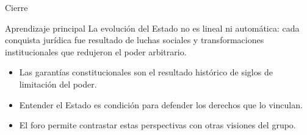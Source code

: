 \documentclass[
  spanish,
  aspectratio=169,
  xcolor={dvipsnames,table}
]{beamer}
\begin{document}
\begin{frame}{Cierre}
  \begin{block}{Aprendizaje principal}
    La evolución del Estado no es lineal ni automática: cada conquista jurídica fue resultado de luchas sociales y transformaciones institucionales que redujeron el poder arbitrario.
  \end{block}
  \begin{itemize}
    \item Las garantías constitucionales son el resultado histórico de siglos de limitación del poder.
    \item Entender el Estado es condición para defender los derechos que lo vinculan.
    \item El foro permite contrastar estas perspectivas con otras visiones del grupo.
  \end{itemize}
\end{frame}
\end{document}
